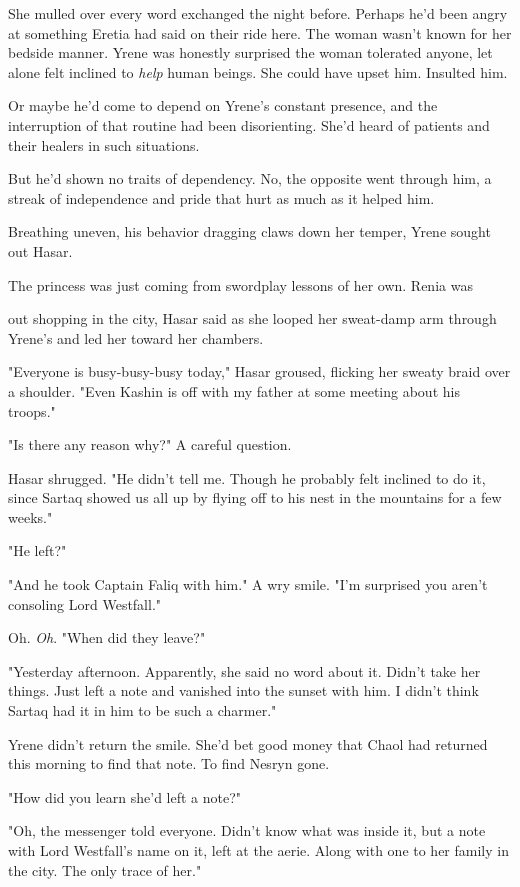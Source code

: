 She mulled over every word exchanged the night before. Perhaps he'd been angry at something Eretia had said on their ride here. The woman wasn't known for her bedside manner. Yrene was honestly surprised the woman tolerated anyone, let alone felt inclined to \emph{help} human beings. She could have upset him. Insulted him.

Or maybe he'd come to depend on Yrene's constant presence, and the interruption of that routine had been disorienting. She'd heard of patients and their healers in such situations.

But he'd shown no traits of dependency. No, the opposite went through him, a streak of independence and pride that hurt as much as it helped him.

Breathing uneven, his behavior dragging claws down her temper, Yrene sought out Hasar.

The princess was just coming from swordplay lessons of her own. Renia was

out shopping in the city, Hasar said as she looped her sweat-damp arm through Yrene's and led her toward her chambers.

"Everyone is busy-busy-busy today," Hasar groused, flicking her sweaty braid over a shoulder. "Even Kashin is off with my father at some meeting about his troops."

"Is there any reason why?" A careful question.

Hasar shrugged. "He didn't tell me. Though he probably felt inclined to do it, since Sartaq showed us all up by flying off to his nest in the mountains for a few weeks."

"He left?"

"And he took Captain Faliq with him." A wry smile. "I'm surprised you aren't consoling Lord Westfall."

Oh. \emph{Oh}. "When did they leave?"

"Yesterday afternoon. Apparently, she said no word about it. Didn't take her things. Just left a note and vanished into the sunset with him. I didn't think Sartaq had it in him to be such a charmer."

Yrene didn't return the smile. She'd bet good money that Chaol had returned this morning to find that note. To find Nesryn gone.

"How did you learn she'd left a note?"

"Oh, the messenger told everyone. Didn't know what was inside it, but a note with Lord Westfall's name on it, left at the aerie. Along with one to her family in the city. The only trace of her."

